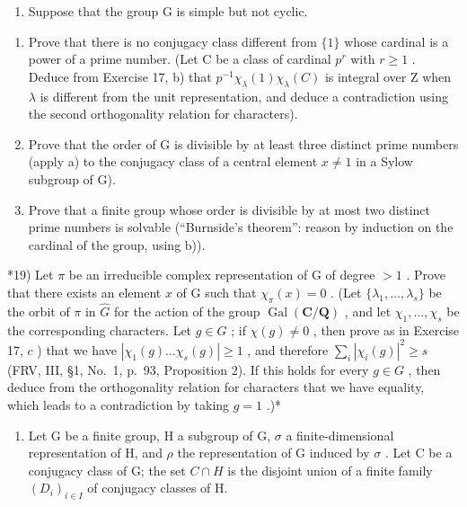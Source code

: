 \begin{enumerate}
\def\labelenumi{\arabic{enumi})}
\setcounter{enumi}{17}
\tightlist
\item
  Suppose that the group G is simple but not cyclic.
\end{enumerate}

\begin{enumerate}
\def\labelenumi{\alph{enumi})}
\item
  Prove that there is no conjugacy class different from \(\{1\}\) whose cardinal is a power of a prime number. (Let C be a class of cardinal \(p^{r}\) with \(r \geqslant 1\) . Deduce from Exercise 17, b) that \(p^{-1}\chi_{\lambda}(1)\chi_{\lambda}(C)\) is integral over Z when \(\lambda\) is different from the unit representation, and deduce a contradiction using the second orthogonality relation for characters).
\item
  Prove that the order of G is divisible by at least three distinct prime numbers (apply a) to the conjugacy class of a central element \(x \neq 1\) in a Sylow subgroup of G).
\item
  Prove that a finite group whose order is divisible by at most two distinct prime numbers is solvable (``Burnside's theorem'': reason by induction on the cardinal of the group, using b)).
\end{enumerate}

*19) Let \(\pi\) be an irreducible complex representation of G of degree \(>1\) . Prove that there exists an element \(x\) of G such that \(\chi_{\pi}(x)=0\) . (Let \(\{\lambda_1,\ldots,\lambda_s\}\) be the orbit of \(\pi\) in \(\widehat{G}\) for the action of the group \(\operatorname{Gal}(\mathbf{C}/\mathbf{Q})\) , and let \(\chi_1,\ldots,\chi_s\) be the corresponding characters. Let \(g\in G\) ; if \(\chi(g)\neq 0\) , then prove as in Exercise 17, \(c\) ) that we have \(|\chi_1(g)\ldots\chi_s(g)|\geqslant 1\) , and therefore \(\sum_i|\chi_i(g)|^2\geqslant s\) (FRV, III, §1, No.~1, p.~93, Proposition 2). If this holds for every \(g\in G\) , then deduce from the orthogonality relation for characters that we have equality, which leads to a contradiction by taking \(g=1\) .)*

\begin{enumerate}
\def\labelenumi{\arabic{enumi})}
\setcounter{enumi}{19}
\tightlist
\item
  Let G be a finite group, H a subgroup of G, \(\sigma\) a finite-dimensional representation of H, and \(\rho\) the representation of G induced by \(\sigma\) . Let C be a conjugacy class of G; the set \(C \cap H\) is the disjoint union of a finite family \((D_{i})_{i \in I}\) of conjugacy classes of H.
\end{enumerate}

